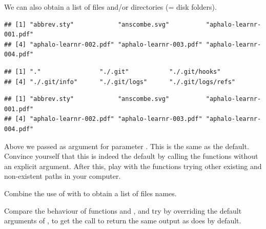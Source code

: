 \documentclass[krantz2]{krantz}\usepackage{knitr}%
\begin{document}
We can also obtain a list of files and/or directories (= disk folders).
\begin{knitrout}\footnotesize
{}\color{fgcolor}\begin{kframe}
\begin{alltt}
\hlstd{(}\hlstd{(}\hlstd{))}
\end{alltt}
\begin{verbatim}
## [1] "abbrev.sty"            "anscombe.svg"          "aphalo-learnr-001.pdf"
## [4] "aphalo-learnr-002.pdf" "aphalo-learnr-003.pdf" "aphalo-learnr-004.pdf"
\end{verbatim}
\begin{alltt}
\hlstd{(}\hlstd{(}\hlstd{))}
\end{alltt}
\begin{verbatim}
## [1] "."                "./.git"           "./.git/hooks"    
## [4] "./.git/info"      "./.git/logs"      "./.git/logs/refs"
\end{verbatim}
\begin{alltt}
\hlstd{(}\hlstd{(}\hlstd{))}
\end{alltt}
\begin{verbatim}
## [1] "abbrev.sty"            "anscombe.svg"          "aphalo-learnr-001.pdf"
## [4] "aphalo-learnr-002.pdf" "aphalo-learnr-003.pdf" "aphalo-learnr-004.pdf"
\end{verbatim}
\end{kframe}
\end{knitrout}

\begin{playground}
Above we passed  as argument for parameter . This is the same as the default. Convince yourself that this is indeed the default by calling the functions without an explicit argument. After this, play with the functions trying other existing and non-existent paths in your computer.
\end{playground}

\begin{playground}
Combine the use of  with  to obtain a list of files names.
\end{playground}

\begin{playground}
Compare the behaviour of functions  and , and try by overriding the default arguments of , to get the call to return the same output as  does by default.
\end{playground}
\end{document}
